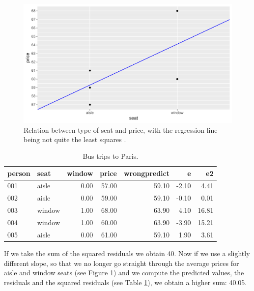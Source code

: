 \documentclass[]{report}\usepackage[]{graphicx}\usepackage[]{color}
\makeatletter
\def\maxwidth{ %
  \ifdim\Gin@nat@width>\linewidth
    \linewidth
  \else
    \Gin@nat@width
  \fi
}
\newenvironment{knitrout}{}{} %
\makeatother
\begin{document}
\begin{knitrout}
\color{fgcolor}\begin{figure}

{\centering \includegraphics[width=\maxwidth]{figure/dummy_6-1} 

}

\caption[Relation between type of seat and price, with the regression line being not quite the least squares ]{Relation between type of seat and price, with the regression line being not quite the least squares .}\label{fig:dummy_6}
\end{figure}


\end{knitrout}


\begin{table}[ht]
\centering
\caption{Bus trips to Paris.} 
\label{tab:dummy_7}
\begin{tabular}{llrrrrr}
  \hline
person & seat & window & price & wrongpredict & e & e2 \\ 
  \hline
001 & aisle & 0.00 & 57.00 & 59.10 & -2.10 & 4.41 \\ 
  002 & aisle & 0.00 & 59.00 & 59.10 & -0.10 & 0.01 \\ 
  003 & window & 1.00 & 68.00 & 63.90 & 4.10 & 16.81 \\ 
  004 & window & 1.00 & 60.00 & 63.90 & -3.90 & 15.21 \\ 
  005 & aisle & 0.00 & 61.00 & 59.10 & 1.90 & 3.61 \\ 
   \hline
\end{tabular}
\end{table}


If we take the sum of the squared residuals we obtain 40. Now if we use a slightly different slope, so that we no longer go straight through the average prices for aisle and window seats (see Figure \ref{fig:dummy_6}) and we compute the predicted values, the residuals and the squared residuals (see Table \ref{tab:dummy_7}), we obtain a higher sum: 40.05. 
\end{document}
